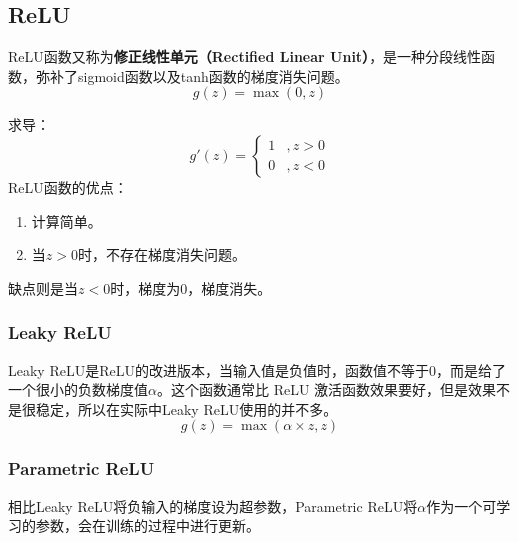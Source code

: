 \documentclass[../../main.tex]{subfiles}
\begin{document}
\subsection{ReLU}
ReLU函数又称为\textbf{修正线性单元（Rectified Linear Unit）}，是一种分段线性函数，弥补了sigmoid函数以及tanh函数的梯度消失问题。
\[g(z) = \max(0, z)\]
\begin{figure}[H]
        \centering
\end{figure}
求导：\[g'(z) = \begin{cases}
    1 & , z>0 \\
    0 & ,z<0
\end{cases}\]
ReLU函数的优点：
\begin{enumerate}
    \item 计算简单。
    \item 当\(z>0\)时，不存在梯度消失问题。
\end{enumerate}
缺点则是当\(z<0\)时，梯度为0，梯度消失。
\subsubsection{Leaky ReLU}
Leaky ReLU是ReLU的改进版本，当输入值是负值时，函数值不等于0，而是给了一个很小的负数梯度值\(α\)。这个函数通常比 ReLU 激活函数效果要好，但是效果不是很稳定，所以在实际中Leaky ReLU使用的并不多。
\[g(z) = \max{(α×z,z)}\]
\begin{figure}[H]
    \centering
\end{figure}
\subsubsection{Parametric ReLU}
相比Leaky ReLU将负输入的梯度设为超参数，Parametric ReLU将\(α\)作为一个可学习的参数，会在训练的过程中进行更新。
\end{document}
